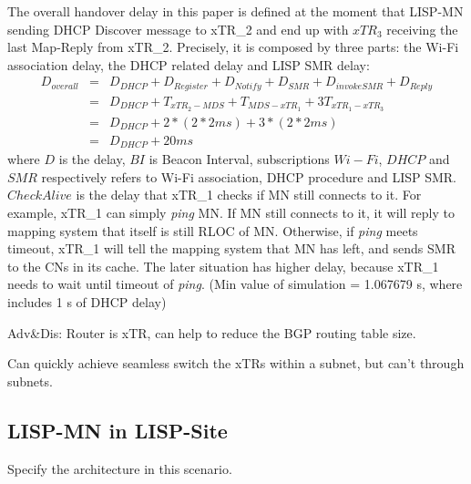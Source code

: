 The overall handover delay in this paper is defined at the moment that LISP-MN sending DHCP Discover message to xTR\_2 and end up with $xTR_3$ receiving the last Map-Reply from xTR\_2. Precisely, it is composed by three parts: the Wi-Fi association delay, the DHCP related delay and LISP SMR delay:
\begin{eqnarray}
D_{overall} &=& D_{DHCP} + D_{Register} + D_{Notify} + D_{SMR} + D_{invokeSMR} + D_{Reply} \nonumber \\
&=& D_{DHCP} +T_{xTR_2-MDS} + T_{MDS-xTR_1} + 3T_{xTR_1-xTR_3} \nonumber \\
&=& D_{DHCP} +2* (2*2ms) + 3*(2*2ms) \nonumber \\
&=& D_{DHCP} + 20 ms
\end{eqnarray}
where $D$ is the delay, $BI$ is Beacon Interval, subscriptions $Wi-Fi$, $DHCP$ and $SMR$ respectively refers to Wi-Fi association, DHCP procedure and LISP SMR. $CheckAlive$ is the delay that xTR\_1 checks if MN still connects to it. For example, xTR\_1 can simply \emph{ping} MN. If MN still connects to it, it will reply to mapping system that itself is still RLOC of MN. Otherwise, if \emph{ping} meets timeout, xTR\_1 will tell the mapping system that MN has left, and sends SMR to the CNs in its cache. The later situation has higher delay, because xTR\_1 needs to wait until timeout of \emph{ping}. (Min value of simulation = 1.067679 s, where includes 1 s of DHCP delay)

Adv\&Dis: Router is xTR, can help to reduce the BGP routing table size.

Can quickly achieve seamless switch the xTRs within a subnet, but can't through subnets.



\subsection{LISP-MN in LISP-Site}
\label{sec:ns3_analysis_lispmn_xTR}
Specify the architecture in this scenario.


